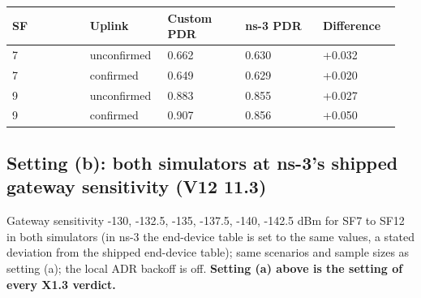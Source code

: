 {\scriptsize\raggedright
\begin{longtable}{p{0.190\linewidth}p{0.190\linewidth}p{0.190\linewidth}p{0.190\linewidth}p{0.190\linewidth}}
\toprule
SF & Uplink & Custom PDR & ns-3 PDR & Difference \\
\midrule
\endhead
7 & unconfirmed & 0.662 & 0.630 & +0.032 \\
7 & confirmed & 0.649 & 0.629 & +0.020 \\
9 & unconfirmed & 0.883 & 0.855 & +0.027 \\
9 & confirmed & 0.907 & 0.856 & +0.050 \\
\bottomrule
\end{longtable}}

\subsection*{Setting (b): both simulators at ns-3's shipped gateway sensitivity (V12 11.3)}

Gateway sensitivity -130, -132.5, -135, -137.5, -140, -142.5 dBm for SF7 to SF12 in both simulators (in ns-3 the end-device table is set to the same values, a stated deviation from the shipped end-device table); same scenarios and sample sizes as setting (a); the local ADR backoff is off. \textbf{Setting (a) above is the setting of every X1.3 verdict.}

